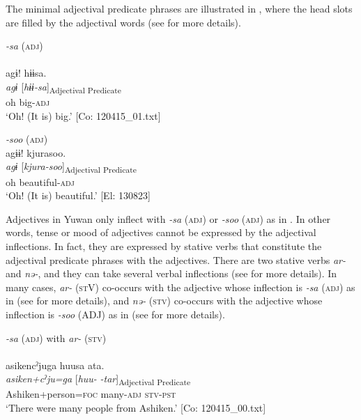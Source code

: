 The minimal adjectival predicate phrases are illustrated in , where the head slots are filled by the adjectival words (see  for more details).

\ea   \label{ex:4.10}
\ea \textit{{}-sa} (\textsc{adj}) \label{ex:4.10a}\\\\
\glll   agɨ!  hɨɨsa.\\
    \textit{agɨ}  [\textit{hɨɨ-sa}]\textsubscript{Adjectival Predicate}\\
    oh  big-\textsc{adj}\\
    \glt     ‘Oh! (It is) big.’ [Co: 120415\_01.txt]

  \ex \textit{{}-soo} (\textsc{adj})\\
\glll   agɨɨ!  kjurasoo.\\
    \textit{agɨ}  [\textit{kjura-soo}]\textsubscript{Adjectival Predicate}\\
    oh  beautiful-\textsc{adj}\\
    \glt     ‘Oh! (It is) beautiful.’ [El: 130823]
    \z
\z

 Adjectives in Yuwan only inflect with \textit{-sa} (\textsc{adj}) or \textit{-soo} (\textsc{adj}) as in . In other words, tense or mood of adjectives cannot be expressed by the adjectival inflections. In fact, they are expressed by stative verbs that constitute the adjectival predicate phrases with the adjectives. There are two stative verbs \textit{ar-} and \textit{nə-}, and they can take several verbal inflections (see  for more details). In many cases, \textit{ar-} (\textsc{st}V) co-occurs with the adjective whose inflection is \textit{{}-sa} (\textsc{adj}) as in  (see  for more details), and \textit{nə-} (\textsc{stv}) co-occurs with the adjective whose inflection is \textit{{}-soo} (ADJ) as in  (see  for more details).

\ea  \label{ex:4.11}
 \ea \textit{{}-sa} (\textsc{adj}) with \textit{ar-} (\textsc{stv}) \label{ex:4.11a}\\\\
\glll  asikencˀjuga  huusa  ata.\\
    \textit{asiken+cˀju=ga}  [\textit{huu-}  \textit{-tar}]\textsubscript{Adjectival Predicate}\\
    Ashiken+person=\textsc{foc}  many-\textsc{adj}  \textsc{stv}-\textsc{pst}\\
    \glt     ‘There were many people from Ashiken.’ [Co: 120415\_00.txt]

